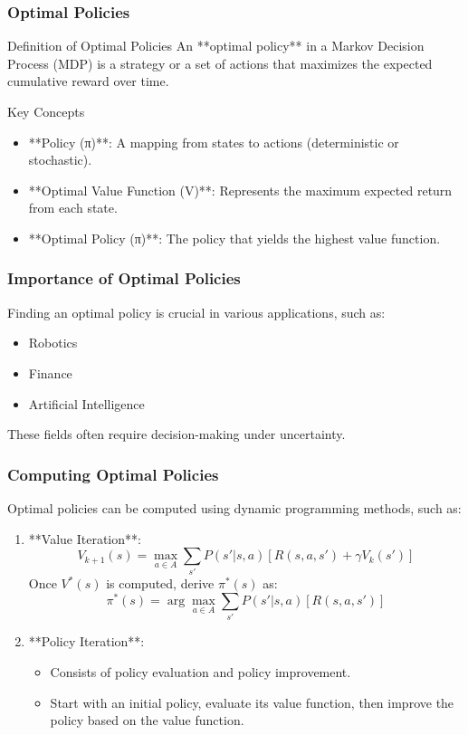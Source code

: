 \documentclass[aspectratio=169]{beamer}
\begin{document}
\begin{frame}[fragile]
  \frametitle{Optimal Policies}
  \begin{block}{Definition of Optimal Policies}
    An **optimal policy** in a Markov Decision Process (MDP) is a strategy or a set of actions that maximizes the expected cumulative reward over time. 
  \end{block}
  
  \begin{block}{Key Concepts}
    \begin{itemize}
      \item **Policy (π)**: A mapping from states to actions (deterministic or stochastic).
      \item **Optimal Value Function (V\*)**: Represents the maximum expected return from each state.
      \item **Optimal Policy (π\*)**: The policy that yields the highest value function.
    \end{itemize}
  \end{block}
\end{frame}

\begin{frame}[fragile]
  \frametitle{Importance of Optimal Policies}
  Finding an optimal policy is crucial in various applications, such as:
  \begin{itemize}
    \item Robotics
    \item Finance
    \item Artificial Intelligence
  \end{itemize}
  These fields often require decision-making under uncertainty.
\end{frame}

\begin{frame}[fragile]
  \frametitle{Computing Optimal Policies}
  Optimal policies can be computed using dynamic programming methods, such as:
  \begin{enumerate}
    \item **Value Iteration**:
      \begin{equation}
      V_{k+1}(s) = \max_{a \in A} \sum_{s'} P(s'|s,a)\left[R(s,a,s') + \gamma V_k(s')\right]
      \end{equation}
      Once \( V^*(s) \) is computed, derive \( \pi^*(s) \) as:
      \begin{equation}
      \pi^*(s) = \arg \max_{a \in A} \sum_{s'} P(s'|s,a)[R(s,a,s')]
      \end{equation}
    
    \item **Policy Iteration**:
      \begin{itemize}
        \item Consists of policy evaluation and policy improvement.
        \item Start with an initial policy, evaluate its value function, then improve the policy based on the value function.
      \end{itemize}
  \end{enumerate}
\end{frame}
\end{document}
